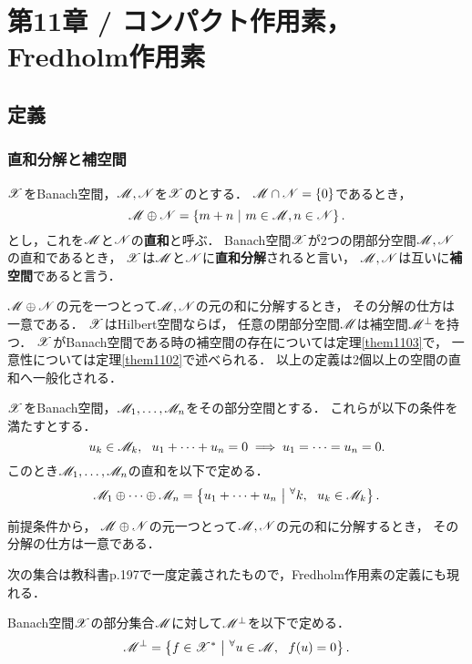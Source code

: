 \section{第11章 / コンパクト作用素，Fredholm作用素}
    \subsection{定義}
    \subsubsection{直和分解と補空間}
    \begin{Def}
        $\mathscr{X}$をBanach空間，$\mathscr{M}, \mathscr{N}$を$\mathscr{X}$のとする．
        $\mathscr{M} \cap \mathscr{N}=\{0\}$であるとき，
        \[ \mathscr{M} \oplus \mathscr{N}=\left\{m+n~\middle|~m \in \mathscr{M}, n \in \mathscr{N}\right\}. \]
        とし，これを$\mathscr{M}$と$\mathscr{N}$の\textbf{直和}と呼ぶ．
        Banach空間$\mathscr{X}$が2つの閉部分空間$\mathscr{M}, \mathscr{N}$の直和であるとき，
        $\mathscr{X}$は$\mathscr{M}$と$\mathscr{N}$に\textbf{直和分解}されると言い，
        $\mathscr{M}, \mathscr{N}$は互いに\textbf{補空間}であると言う．
    \end{Def}
    $\mathscr{M} \oplus \mathscr{N}$の元を一つとって$\mathscr{M}, \mathscr{N}$の元の和に分解するとき，
    その分解の仕方は一意である．
    $\mathscr{X}$はHilbert空間ならば，
    任意の閉部分空間$\mathscr{M}$は補空間$\mathscr{M}^{\perp}$を持つ．
    $\mathscr{X}$がBanach空間である時の補空間の存在については定理\ref{them1103}で，
    一意性については定理\ref{them1102}で述べられる．
    以上の定義は2個以上の空間の直和へ一般化される．
    \begin{Def}
        $\mathscr{X}$をBanach空間，$\mathscr{M}_1,\dots,\mathscr{M}_n$をその部分空間とする．
        これらが以下の条件を満たすとする．
        \[ u_k \in \mathscr{M}_k,~~ u_1+\dots+u_n=0 \implies u_1=\dots=u_n=0. \]
        このとき$\mathscr{M}_1,\dots,\mathscr{M}_n$の直和を以下で定める．
        \[
            \mathscr{M}_1 \oplus \dots \oplus \mathscr{M}_n
            =\left\{u_1+\dots+u_n~\middle|~{}^{\forall} k,~~ u_k \in \mathscr{M}_k\right\}.
        \]
    \end{Def}
    前提条件から，
    $\mathscr{M} \oplus \mathscr{N}$の元一つとって$\mathscr{M}, \mathscr{N}$の元の和に分解するとき，
    その分解の仕方は一意である．

    次の集合は教科書p.197で一度定義されたもので，Fredholm作用素の定義にも現れる．
    \begin{Def}
        Banach空間$\mathscr{X}$の部分集合$\mathscr{M}$に対して$\mathscr{M}^{\perp}$を以下で定める．
        \[ \mathscr{M}^{\perp}=\left\{f \in \mathscr{X}^*~\middle|~{}^{\forall} u \in \mathscr{M},~~ f(u)=0\right\}. \]
    \end{Def}

